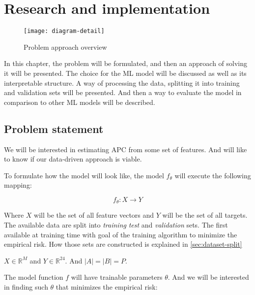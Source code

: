 \setchapterpreamble[u]{\margintoc}
\chapter{Research and implementation}
\label{ch:problem}

\begin{figure}[hb]
    \texttt{[image: diagram-detail]}
    \caption[Problem modelling overview]{Problem approach overview}
\end{figure}

In this chapter, the problem will be formulated, and then an approach of solving it will be presented. The choice for the ML model will be discussed as well as its interpretable structure. A way of processing the data, splitting it into training and validation sets will be presented. And then a way to evaluate the model in comparison to other ML models will be described.

\section{Problem statement}



We will be interested in estimating \acrfull{APC} from some set of features. And will like to know if our data-driven approach is viable.

To formulate how the model will look like, the model $f_\theta$ will execute the following mapping:

\[
    f_{\theta}: X \rightarrow Y
\]

Where $X$ will be the set of all feature vectors and $Y$ will be the set of all targets. The available data are split into \textit{training} \textit{test} and \textit{validation} sets. The first available at training time with goal of the training algorithm to minimize the empirical risk. How those sets are constructed is explained in \ref{sec:dataset-split}


$X \in \mathbb{R}^M$ and $Y\in \mathbb{R}^{24}$. And $| A | = | B | = P$.

The model function $f$ will have trainable parameters $\theta$. And we will be interested in finding such $\theta$ that minimizes the empirical risk:

